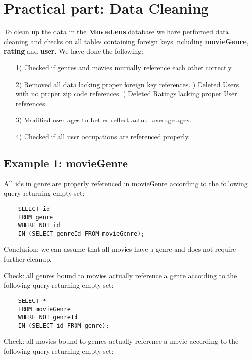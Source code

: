 \section{Practical part: Data Cleaning}

To clean up the data in the \textbf{MovieLens} database we have performed data cleaning and checks on all tables containing foreign keys including \textbf{movieGenre}, \textbf{rating} and \textbf{user}. We have done the following: 

\begin{itemize}
	\item [1)] Checked if genres and movies mutually reference each other correctly.
	\item [2)] Removed all data lacking proper foreign key references.
	) Deleted Users with no proper zip code references. 
	) Deleted Ratings lacking proper User references.
	\item [3)] Modified user ages to better reflect actual average ages. 
	\item [4)] Checked if all user occupations are referenced properly. 
\end{itemize}

\subsection{Example 1: movieGenre}

All ids in genre are properly referenced in movieGenre according to the following query returning empty set: 

\begin{verbatim}
	SELECT id 
	FROM genre 
	WHERE NOT id 
	IN (SELECT genreId FROM movieGenre); 
\end{verbatim}

\noindent Conclusion: we can assume that all movies have a genre and does not require further cleanup. \newline

\noindent Check: all genres bound to movies actually reference a genre according to the following query returning empty set: 

\begin{verbatim}
	SELECT * 
	FROM movieGenre
	WHERE NOT genreId
	IN (SELECT id FROM genre);
\end{verbatim}

\noindent Check: all movies bound to genres actually reference a movie according to the following query returning empty set: 

